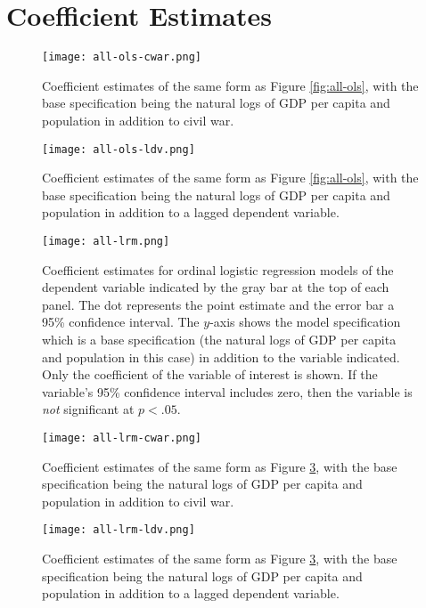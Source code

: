 \documentclass[11pt]{article}
\begin{document}
\clearpage

\section{Coefficient Estimates}

\begin{figure}[!htpb]
\texttt{[image: all-ols-cwar.png]}
\caption{Coefficient estimates of the same form as Figure \ref{fig:all-ols}, with the base specification being the natural logs of GDP per capita and population in addition to civil war.}
\label{fig:all-ols-cwar}
\end{figure}

\begin{figure}[!htpb]
\texttt{[image: all-ols-ldv.png]}
\caption{Coefficient estimates of the same form as Figure \ref{fig:all-ols}, with the base specification being the natural logs of GDP per capita and population in addition to a lagged dependent variable.}
\label{fig:all-ols-ldv}
\end{figure}

\begin{figure}[!htpb]
\texttt{[image: all-lrm.png]}
\caption{Coefficient estimates for ordinal logistic regression models of the dependent variable indicated by the gray bar at the top of each panel. The dot represents the point estimate and the error bar a 95\% confidence interval. The $y$-axis shows the model specification which is a base specification (the natural logs of GDP per capita and population in this case) in addition to the variable indicated. Only the coefficient of the variable of interest is shown. If the variable's 95\% confidence interval includes zero, then the variable is \textit{not} significant at $p < .05$.}
\label{fig:all-lrm}
\end{figure}

\begin{figure}[!htpb]
\texttt{[image: all-lrm-cwar.png]}
\caption{Coefficient estimates of the same form as Figure \ref{fig:all-lrm}, with the base specification being the natural logs of GDP per capita and population in addition to civil war.}
\label{fig:all-lrm-cwar}
\end{figure}

\begin{figure}[!htpb]
\texttt{[image: all-lrm-ldv.png]}
\caption{Coefficient estimates of the same form as Figure \ref{fig:all-lrm}, with the base specification being the natural logs of GDP per capita and population in addition to a lagged dependent variable.}
\label{fig:all-lrm-ldv}
\end{figure}
\end{document}
